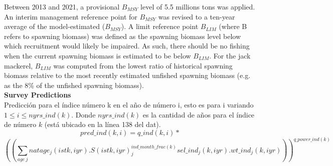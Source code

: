 \documentclass{article}
\begin{document}
Between 2013 and 2021, a provisional \(B_{MSY}\) level of 5.5 millions tons was applied. 
An interim management reference point for \(B_{MSY}\) was revised to a ten-year average of the model-estimated (\(B_{MSY}\)). 
A limit reference point \(B_{LIM}\) (where B refers to spawning biomass) was defined as the spawning biomass level below which recruitment would likely be impaired. As such, there should be no fishing when the current spawning biomass is estimated to be below \(B_{LIM}\).
For the jack mackerel, \(B_{LIM}\) was computed from the lowest ratio of historical spawning biomass relative to the most recently estimated unfished spawning biomass (e.g. as the 8\% of the unfished spawning biomass).\\





\textbf{Survey Predictions}\\
Predicción para el índice número k en el año de número i, esto es para i variando $1\leq i \leq nyrs\_ind(k)$. Donde $nyrs\_ind(k)$ es la cantidad de años para el índice de número $k$ (está ubicado en la línea 138 del dat).
\begin{equation}
    pred\_ind(k,i)=q\_ind(k,i)* 
\end{equation}
\begin{equation}
    \left(\left(\sum_{age \ j}natage_j(istk,iyr).S(istk,iyr)_j^{ind\_month\_frac(k)}sel\_ind_j(k,iyr).wt\_ind_j(k,iyr)\right)\right)^{q\_power\_ind(k)}
\end{equation}
\end{document}
